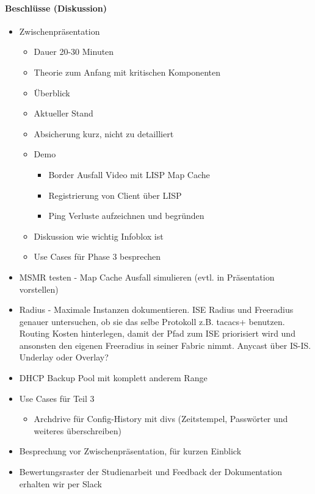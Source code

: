 \paragraph{Beschlüsse (Diskussion)}
\begin{itemize}	
	\item Zwischenpräsentation
	\begin{itemize}
		\item Dauer 20-30 Minuten
		\item Theorie zum Anfang mit kritischen Komponenten
		\item Überblick
		\item Aktueller Stand
		\item Absicherung kurz, nicht zu detailliert
		\item Demo 
		\begin{itemize}
			\item Border Ausfall Video mit LISP Map Cache
			\item Registrierung von Client über LISP 
			\item Ping Verluste aufzeichnen und begründen
		\end{itemize}
		\item Diskussion wie wichtig Infoblox ist
		\item Use Cases für Phase 3 besprechen
	\end{itemize}	
	\item MSMR testen - Map Cache Ausfall simulieren (evtl. in Präsentation vorstellen)
	\item Radius - Maximale Instanzen dokumentieren. ISE Radius und Freeradius genauer untersuchen, ob sie das selbe Protokoll z.B. tacacs+ benutzen. Routing Kosten hinterlegen, damit der Pfad zum ISE priorisiert wird und ansonsten den eigenen Freeradius in seiner Fabric nimmt. Anycast über IS-IS. Underlay oder Overlay?
	\item DHCP Backup Pool mit komplett anderem Range
	\item Use Cases für Teil 3
	\begin{itemize}
		\item Archdrive für Config-History mit divs (Zeitstempel, Passwörter und weiteres überschreiben)
	\end{itemize}
	\item Besprechung vor Zwischenpräsentation, für kurzen Einblick
	\item Bewertungsraster der Studienarbeit und Feedback der Dokumentation erhalten wir per Slack
\end{itemize}

